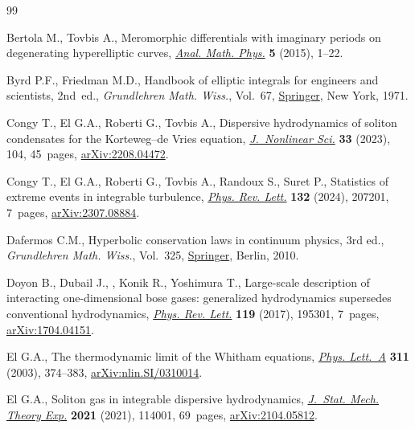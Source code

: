 \documentclass[pdftex]{sigma}
\numberwithin{equation}{section}
\begin{document}
\begin{thebibliography}{99}
\footnotesize\itemsep=0pt

Bertola M., Tovbis A., Meromorphic differentials with imaginary periods on
 degenerating hyperelliptic curves, \href{https://doi.org/10.1007/s13324-014-0088-7}{\textit{Anal. Math. Phys.}} \textbf{5}
 (2015), 1--22.

Byrd P.F., Friedman M.D., Handbook of elliptic integrals for engineers and
 scientists, 2nd~ed., \textit{Grundlehren Math. Wiss.}, Vol.~67, \href{https://doi.org/10.1007/978-3-642-65138-0}{Springer}, New York,
 1971.

Congy T., El G.A., Roberti G., Tovbis A., Dispersive hydrodynamics of soliton
 condensates for the {K}orteweg--de {V}ries equation, \href{https://doi.org/10.1007/s00332-023-09940-y}{\textit{J.~Nonlinear
 Sci.}} \textbf{33} (2023), 104, 45~pages, \href{https://arxiv.org/abs/2208.04472}{arXiv:2208.04472}.

Congy T., El G.A., Roberti G., Tovbis A., Randoux S., Suret P., Statistics of
 extreme events in integrable turbulence, \href{https://doi.org/10.1103/physrevlett.132.207201}{\textit{Phys. Rev. Lett.}}
 \textbf{132} (2024), 207201, 7~pages, \href{https://arxiv.org/abs/2307.08884}{arXiv:2307.08884}.

Dafermos C.M., Hyperbolic conservation laws in continuum physics, 3rd ed.,
 \textit{Grundlehren Math. Wiss.}, Vol.~325, \href{https://doi.org/10.1007/978-3-642-04048-1}{Springer}, Berlin, 2010.

Doyon B., Dubail J., , Konik R., Yoshimura T., Large-scale description of
 interacting one-dimensional bose gases: generalized hydrodynamics supersedes
 conventional hydrodynamics, \href{https://doi.org/10.1103/PhysRevLett.119.195301}{\textit{Phys. Rev. Lett.}} \textbf{119} (2017),
 195301, 7~pages, \href{https://arxiv.org/abs/1704.04151}{arXiv:1704.04151}.

El G.A., The thermodynamic limit of the {W}hitham equations, \href{https://doi.org/10.1016/S0375-9601(03)00515-2}{\textit{Phys.
 Lett.~A}} \textbf{311} (2003), 374--383, \href{https://arxiv.org/abs/nlin.SI/0310014}{arXiv:nlin.SI/0310014}.

El G.A., Soliton gas in integrable dispersive hydrodynamics, \href{https://doi.org/10.1088/1742-5468/ac0f6d}{\textit{J.~Stat.
 Mech. Theory Exp.}} \textbf{2021} (2021), 114001, 69~pages,
 \href{https://arxiv.org/abs/2104.05812}{arXiv:2104.05812}.


\end{thebibliography}
\end{document}
